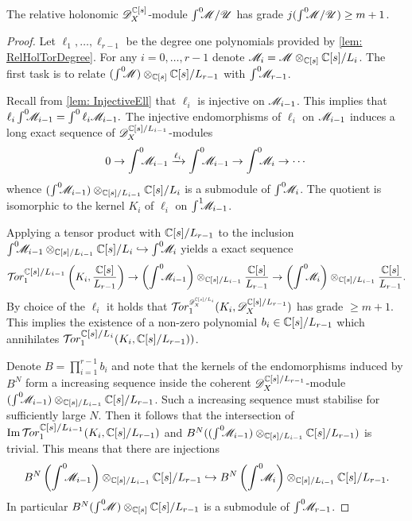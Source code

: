 \begin{lemma}\label{lem: GradeNPlusOne}
  The relative holonomic $\mathscr{D}_X^{\mathbb{C}[s]}$-module $\int^0 \mkern -8mu\mathscr{M}/\mathscr{U}$ has grade $j(\int^0 \mkern -8mu\mathscr{M}/\mathscr{U})\geq m+1$.
\end{lemma}
\begin{proof}
  Let $\ell_1,\ldots,\ell_{r-1}$ be the degree one polynomials provided by \cref{lem: RelHolTorDegree}.
  For any $i=0,\ldots, r-1$ denote $\mathscr{M}_i =  \mathscr{M} \otimes_{\mathbb{C}[s]} \mathbb{C}[s]/L_{i}$.
  The first task is to relate $(\int^0 \mkern -8mu\mathscr{M}) \otimes_{\mathbb{C}[s]} \mathbb{C}[s]/L_{r-1}$ with $\int^0 \mkern -8mu\mathscr{M}_{r-1}$.

  Recall from \cref{lem: InjectiveEll} that $\ell_{i}$ is injective on $\mathscr{M}_{i-1}$.
  This implies that
  $\ell_{i}\int^0 \mkern -8mu \mathscr{M}_{i-1} = \int^0 \ell_{i}\mathscr{M}_{i-1}.$
  The injective endomorphisms of $\ell_i$ on $\mathscr{M}_{i-1}$ induces a long exact sequence of $\mathscr{D}_X^{\mathbb{C}[s]/L_{i-1}}$-modules
  $$0 \to \int^0 \mkern -8mu\mathscr{M}_{i-1} \xrightarrow{\ell_i} \int^0 \mkern -8mu \mathscr{M}_{i-1} \to \int^0 \mkern -8mu \mathscr{M}_i \to \cdots $$
  whence $(\int^0 \mkern -8mu \mathscr{M}_{i-1})\otimes_{\mathbb{C}[s]/L_{i-1}} \mathbb{C}[s]/L_i$ is a submodule of $\int^0 \mkern -8mu\mathscr{M}_i$.
  The quotient is isomorphic to the kernel $K_i$ of $\ell_i$ on $\int^1\mkern -8mu\mathscr{M}_{i-1}$.

  Applying a tensor product with $\mathbb{C}[s]/L_{r-1}$ to the inclusion $\int^0 \mkern -8mu \mathscr{M}_{i-1} \otimes_{\mathbb{C}[s]/L_{i-1}} \mathbb{C}[s]/L_i \hookrightarrow \int^0 \mkern -8mu\mathscr{M}_i$ yields a exact sequence
  $$\Tr{\C[s]/L_{i-1}}{1}\left(K_i, \frac{\C[s]}{L_{r-1}}\right) \to \left(\Int \M_{i-1}\right) \otimes_{\C[s]/L_{i-1}}\frac{\C[s]}{L_{r-1}} \to \left(\Int\M_i\right) \otimes_{\C[s]/L_{i-1}}\frac{\C[s]}{L_{r-1}}.$$
  By choice of the $\ell_i$ it holds that $\Tr{\D_\X^{\C[s]/L_i} }{1}(K_i, \D_\X^{\C[s]/L_{r-1}})$ has grade $\geq m+1$.
  This implies the existence of a non-zero polynomial $b_i\in \mathbb{C}[s]/L_{r-1}$ which annihilates $\Tr{\C[s]/L_{i}}{1}(K_i, \C[s]/\ab L_{r-1} ))$.

  Denote $B = \prod_{i=1}^{r-1}b_i$ and note that the kernels of the endomorphisms induced by $B^N$ form a increasing sequence inside the coherent $\mathscr{D}_X^{\mathbb{C}[s]/L_{r-1}}$-module $(\int^0 \mkern -8mu \mathscr{M}_{i-1})\otimes_{\mathbb{C}[s]/L_{i-1}}\mathbb{C}[s]/L_{r-1}$.
  Such a increasing sequence must stabilise for sufficiently large $N$.
  Then it follows that the intersection of $\img \Tr{\C[s]/L_{i-1}}{1}(K_i, \C[s]/L_{r-1})$ and $ B^N((\int^0 \mkern -8mu \mathscr{M}_{i-1}) \otimes_{\mathbb{C}[s]/L_{i-1}}\mathbb{C}[s]/L_{r-1})$ is trivial.
  This means that there are injections $$B^N \left(\int^0 \mkern -8mu \mathscr{M}_{i-1}\right) \otimes_{\mathbb{C}[s]/L_{i-1}}\mathbb{C}[s]/L_{r-1} \hookrightarrow B^N \left(\int^0 \mkern -8mu\mathscr{M}_i\right)\otimes_{\mathbb{C}[s]/L_{i-1}}\mathbb{C}[s]/L_{r-1}.$$
  In particular $B^N(\int^0 \mkern -8mu\mathscr{M})\otimes_{\mathbb{C}[s]}\mathbb{C}[s]/L_{r-1}$ is a submodule of $\int^0 \mkern -8mu\mathscr{M}_{r-1}$.



\end{proof}
